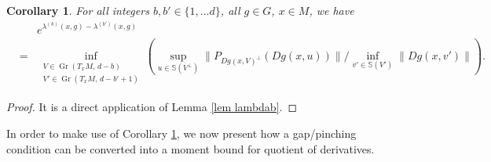\documentclass[11pt, leqno, fleqn]{amsart}
\newcommand{\margem}[1]{\marginpar{{\scriptsize {#1}}}}
\def\clo{   \color{orange}}
\def\clb{   \color{black}}
\DeclareMathOperator{\Gr}{Gr}
\newcommand{\aryst}{\begin{eqnarray*}}
\newcommand{\earyst}{\end{eqnarray*}}
\newtheorem{cor}[thm]{\bf Corollary}
\theoremstyle{definition}
\theoremstyle{definition}
\def\S{ {\mathbb{S}} }
\begin{document}
		
	\begin{cor} \label{lem lambdab1lambdab0+1} 
		For all integers $b,b'\in \{1, \dots d\}$, all $g\in G$, $x\in M$, we have
		\aryst
		&& e^{ \lambda^{(b)}(x, g)  - \lambda^{(b')}(x, g)  } \\
		 &=&
		    \inf_{\substack{V \in \Gr(T_xM, \,d - b) \\ V' \in \Gr(T_xM, \,d - b'+1)} }  \left(  \sup_{u \in \S(  V^{\perp})}  \| P_{   Dg(x, V)^{\perp}}(  Dg(x, u) ) \|  /  \inf_{v' \in \S(V')}  \| Dg(x, v') \| \right).
		\earyst
	\end{cor}

\begin{proof}  
It is a direct application of Lemma  \ref{lem lambdab}.
		\end{proof} 
		


 


			
		
In order to make use of Corollary \ref{lem lambdab1lambdab0+1}, we now present how a gap/pinching condition can be converted into a  moment bound for quotient of derivatives.
 
 
 
 
\end{document}
